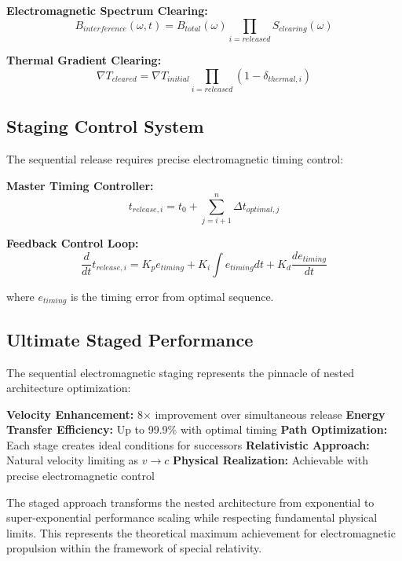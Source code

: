 \documentclass[12pt,a4paper]{article}
\begin{document}
\textbf{Electromagnetic Spectrum Clearing:}
\begin{equation}
B_{interference}(\omega,t) = B_{total}(\omega) \prod_{i=released} S_{clearing}(\omega)
\end{equation}

\textbf{Thermal Gradient Clearing:}
\begin{equation}
\nabla T_{cleared} = \nabla T_{initial} \prod_{i=released} (1 - \delta_{thermal,i})
\end{equation}

\subsection{Staging Control System}

The sequential release requires precise electromagnetic timing control:

\textbf{Master Timing Controller:}
\begin{equation}
t_{release,i} = t_0 + \sum_{j=i+1}^{n} \Delta t_{optimal,j}
\end{equation}

\textbf{Feedback Control Loop:}
\begin{equation}
\frac{d}{dt}t_{release,i} = K_p e_{timing} + K_i \int e_{timing} dt + K_d \frac{de_{timing}}{dt}
\end{equation}

where $e_{timing}$ is the timing error from optimal sequence.

\subsection{Ultimate Staged Performance}

The sequential electromagnetic staging represents the pinnacle of nested architecture optimization:

\textbf{Velocity Enhancement:} 8× improvement over simultaneous release
\textbf{Energy Transfer Efficiency:} Up to 99.9\% with optimal timing
\textbf{Path Optimization:} Each stage creates ideal conditions for successors
\textbf{Relativistic Approach:} Natural velocity limiting as $v \rightarrow c$
\textbf{Physical Realization:} Achievable with precise electromagnetic control

The staged approach transforms the nested architecture from exponential to super-exponential performance scaling while respecting fundamental physical limits. This represents the theoretical maximum achievement for electromagnetic propulsion within the framework of special relativity.
\end{document}
